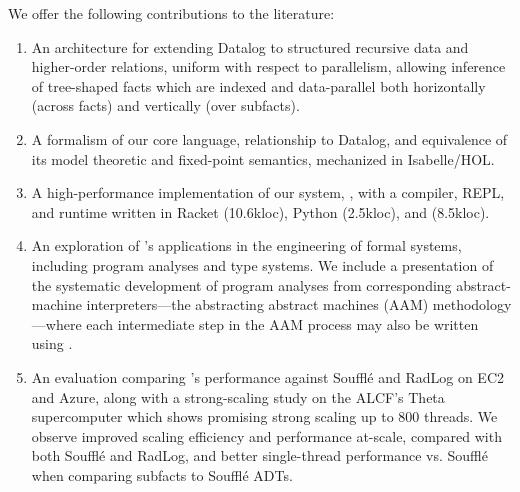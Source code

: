 We offer the following contributions to the literature:
%
\begin{enumerate}
\item An architecture for extending Datalog to structured recursive data and higher-order relations, uniform with respect to parallelism, allowing inference of tree-shaped facts which are indexed and data-parallel both horizontally (across facts) and vertically (over subfacts).
\item A formalism of our core language, relationship to Datalog, and equivalence of its model theoretic and fixed-point semantics, mechanized in Isabelle/HOL.
\item A high-performance implementation of our system, \slog{}, with a compiler, REPL, and runtime written in Racket (10.6kloc), Python (2.5kloc), and \CC{} (8.5kloc).
\item An exploration of \slog{}'s applications in the engineering of formal systems, including program analyses and type systems. We include a
  presentation of the systematic development of program analyses from corresponding abstract-machine interpreters---the abstracting abstract machines (AAM) methodology---where
  each intermediate step in the AAM process may also be written using \slog{}.
\item An evaluation comparing \slog{}'s performance against Souffl\'e and RadLog on EC2 and Azure, along with a strong-scaling study on the ALCF's Theta supercomputer which shows promising strong scaling up to 800 threads. We observe improved scaling efficiency and performance at-scale, compared with both Souffl\'e and RadLog, and better single-thread performance vs. Souffl\'e when comparing \slog{} subfacts to Souffl\'e ADTs.
\end{enumerate}




